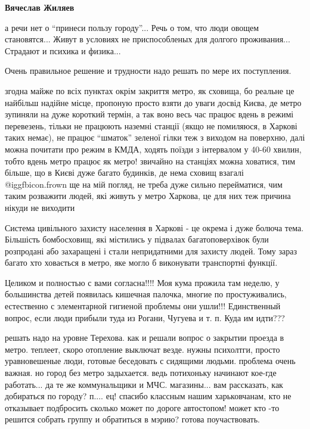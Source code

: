 \begin{itemize}
\begin{itemize} %
\textbf{Вячеслав Жиляев} 

а речи нет о \enquote{принеси пользу городу}... Речь о том, что люди овощем
становятся... Живут в условиях не приспособленых для долгого проживания...
Страдают и психика и физика...

\end{itemize} %


Очень правильное решение и трудности надо решать по мере их поступления.


згодна майже по всіх пунктах окрім закриття метро, як сховища, бо реальне це
найбільш надійне місце, пропоную просто взяти до уваги досвід Києва, де метро
зупиняли на дуже короткий термін, а так воно весь час працює вдень в режимі
перевезень, тільки не працюють наземні станції (якщо не помиляюся, в Харкові
таких немає), не працює \enquote{шматок} зеленої гілки теж з виходом на поверхню, далі
можна почитати про режим в КМДА, ходять поїзди з інтервалом у 40-60 хвилин,
тобто вдень метро працює як метро! звичайно на станціях можна ховатися, тим
більше, що в Києві дуже багато будинків, де нема сховищ взагалі  @igg{fbicon.frown}  ще на мій
погляд, не треба дуже сильно перейматися, чим таким розважити людей, які живуть
у метро Харкова, це для них теж причина нікуди не виходити


Система цивільного захисту населення в Харкові - це окрема і дуже болюча тема.
Більшість бомбосховищ, які містились у підвалах багатоповерхівок були
розпродані або захаращені і стали непридатними для захисту людей. Тому зараз
багато хто ховається в метро, яке могло б виконувати транспортні функції.


Целиком и полностью с вами согласна!!!! Моя кума прожила там неделю, у
большинства детей появилась кишечная палочка, многие по простуживались,
естественно с элементарной гигиеной проблемы они ушли!!! Единственный
вопрос, если люди прибыли туда из Рогани, Чугуева и т. п. Куда им идти???


решать надо на уровне Терехова. как и решали вопрос о закрытии проезда в
метро. теплеет, скоро отопление выключат везде. нужны психолтги, просто
уравновешеные люди, готовые беседовать с сидящими людьми. проблема очень
важная. но город без метро задыхается. ведь потихоньку начинают кое-где
работать... да те же коммунальщики и МЧС. магазины... вам рассказать, как
добираться по городу? п.... ец! спасибо классным нашим харьковчанам, кто не
отказывает подбросить сколько может по дороге автостопом! может кто -то решится
собрать группу и обратиться в мэрию? готова поучаствовать.

\end{itemize} %
